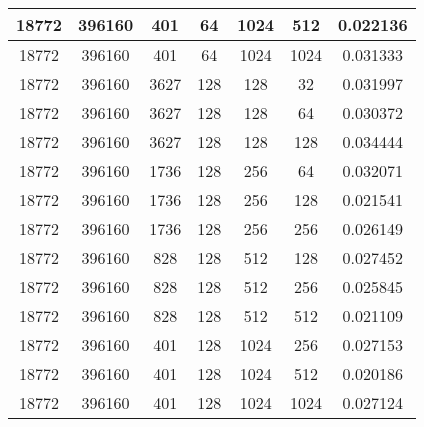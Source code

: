 \documentclass[9pt]{article}
\begin{document}
\begin{tabular}{|c|c|c|c|c|c|c| }
\hline
18772  & 396160  & 401  & 64  & 1024  & 512  & 0.022136 \\
\hline
18772  & 396160  & 401  & 64  & 1024  & 1024  & 0.031333 \\
\hline
18772  & 396160  & 3627  & 128  & 128  & 32  & 0.031997 \\
\hline
18772  & 396160  & 3627  & 128  & 128  & 64  & 0.030372 \\
\hline
18772  & 396160  & 3627  & 128  & 128  & 128  & 0.034444 \\
\hline
18772  & 396160  & 1736  & 128  & 256  & 64  & 0.032071 \\
\hline
18772  & 396160  & 1736  & 128  & 256  & 128  & 0.021541 \\
\hline
18772  & 396160  & 1736  & 128  & 256  & 256  & 0.026149 \\
\hline
18772  & 396160  & 828  & 128  & 512  & 128  & 0.027452 \\
\hline
18772  & 396160  & 828  & 128  & 512  & 256  & 0.025845 \\
\hline
18772  & 396160  & 828  & 128  & 512  & 512  & 0.021109 \\
\hline
18772  & 396160  & 401  & 128  & 1024  & 256  & 0.027153 \\
\hline
18772  & 396160  & 401  & 128  & 1024  & 512  & 0.020186 \\
\hline
18772  & 396160  & 401  & 128  & 1024  & 1024  & 0.027124 \\
\hline
\end{tabular}
 
\end{document}
